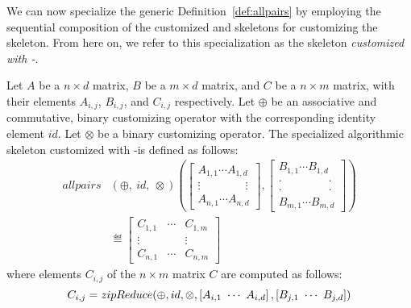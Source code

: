 We can now specialize the generic Definition~\autoref{def:allpairs} by employing the sequential composition of the customized \reduce and \zip skeletons for customizing the \allpairs skeleton.
From here on, we refer to this specialization as the \allpairs skeleton \emph{customized with \zip-\reduce}.

\begin{definition}
  \label{def:allpairs:specialized}
  Let $A$ be a $n\times d$ matrix, $B$ be a $m\times d$ matrix, and $C$ be a $n\times m$ matrix, with their elements $A_{i,j}$, $B_{i,j}$, and $C_{i,j}$ respectively.
  Let $\oplus$ be an associative and commutative, binary customizing operator with the corresponding identity element $id$.
  Let $\otimes$ be a binary customizing operator.
  The specialized algorithmic skeleton \allpairs customized with \zip-\reduce is defined as follows:
  \begin{equation*}
    \begin{split}
    allpairs&(\oplus,\ id,\ \otimes)\left(%
      \left[ \begin{array}{c} A_{1,1} \cdots A_{1,d}\\[.25em] \vdots \hspace{4em} \vdots\\[.25em] A_{n,1} \cdots A_{n,d} \end{array}\right], %
      \left[ \begin{array}{c} B_{1,1} \cdots B_{1,d}\\[-.25em] \cdot \hspace{4em} \cdot\\[-.75em] \cdot \hspace{4em} \cdot\\[-.25em] B_{m,1} \cdots B_{m,d} \end{array}\right]%
      \right)\\
    &\eqdef \left[ \begin{array}{ccc} C_{1,1} & \cdots & C_{1,m}\\[.25em] \vdots & & \vdots\\[.25em] C_{n,1} & \cdots & C_{n,m} \end{array} \right]
    \end{split}
  \end{equation*}
  where elements $C_{i,j}$ of the $n\times m$ matrix $C$ are computed as follows:
  \[
    C_{i,j} = zipReduce(\oplus, id, \otimes, \left[A_{i,1}\ \cdots\ A_{i,d}\right], \left[B_{j,1}\ \cdots\ B_{j,d}\right])
  \]
\end{definition}


